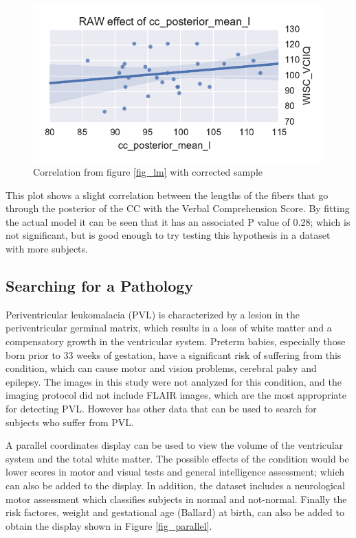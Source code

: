 \documentclass[twocolumn]{svjour3}
\begin{document}
\begin{figure}
\begin{center}
\includegraphics[width=\linewidth]{figures/cases/final_corr}
\end{center}
 \caption{\label{fig_lm2} Correlation from figure \ref{fig_lm} with corrected sample}
\end{figure}


This plot shows a slight correlation between the lengths of the fibers that go through the posterior of the CC with the Verbal Comprehension Score. By fitting the actual model it can be seen that it has an associated P value of 0.28; which is not significant, but is good enough to try testing this hypothesis in a dataset with more subjects.
  

\subsection{Searching for a Pathology}

Periventricular leukomalacia (PVL) is characterized by a lesion in the periventricular germinal matrix, which results in a loss of white matter and a compensatory growth in the ventricular system. Preterm babies, especially those born prior to 33 weeks of gestation, have a significant risk of suffering from this condition, which can cause motor and vision problems, cerebral palsy and epilepsy.    
The images in this study were not analyzed for this condition, and the imaging protocol did not include FLAIR images, which are the most appropriate for detecting PVL. However has other data that can be used to search for subjects who suffer from PVL.

A parallel coordinates display can be used to view the volume of the ventricular system and the total white matter. The possible effects of the condition would be lower scores in motor and visual tests and general intelligence assessment; which can also be added to the display. In addition, the dataset includes a neurological motor assessment which classifies subjects in normal and not-normal.  Finally the risk factores, weight and gestational age (Ballard) at birth, can also be added to obtain the display shown in Figure \ref{fig_parallel}.
\end{document}
